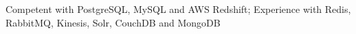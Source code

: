\item Competent with PostgreSQL, MySQL and AWS Redshift; Experience with Redis, RabbitMQ, Kinesis, Solr, CouchDB and MongoDB
